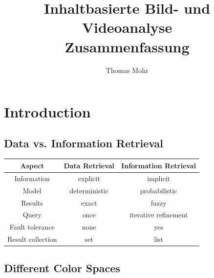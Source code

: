 \documentclass{scrartcl}
\title{Inhaltbasierte Bild- und Videoanalyse \\ Zusammenfassung}
\author{Thomas Mohr}
\date{}
\begin{document}
\maketitle
\pagebreak
\tableofcontents
\pagebreak

\section{Introduction}

\subsection{Data vs. Information Retrieval}

\begin{tabular}{|c|c|c|}
	\hline 
	Aspect & Data Retrieval & Information Retrieval \\ 
	\hline \hline
	Information & explicit & implicit \\ 
	\hline 
	Model & deterministic & probabilistic \\ 
	\hline 
	Results & exact & fuzzy \\ 
	\hline 
	Query & once & iterative refinement \\ 
	\hline 
	Fault tolerance & none & yes \\ 
	\hline 
	Result collection & set & list \\ 
	\hline 
\end{tabular} 

\subsection{Different Color Spaces}
\end{document}
